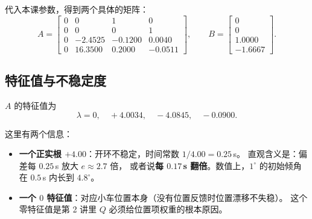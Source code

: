 代入本课参数，得到两个具体的矩阵：
\begin{equation}
  A = \begin{bmatrix}
    0 & 0 & 1 & 0\\
    0 & 0 & 0 & 1\\
    0 & -2.4525 & -0.1200 & 0.0040\\
    0 & 16.3500 & 0.2000 & -0.0511
  \end{bmatrix},
  \qquad
  B = \begin{bmatrix} 0 \\ 0 \\ 1.0000 \\ -1.6667 \end{bmatrix}.
  \label{eq:ABnum}
\end{equation}


\subsection{特征值与不稳定度}

$A$ 的特征值为
\begin{equation}
  \lambda = 0,\quad +4.0034,\quad -4.0845,\quad -0.0900 .
\end{equation}

这里有两个信息：

\begin{itemize}[leftmargin=2em,itemsep=2pt]
  \item \textbf{一个正实根 $+4.00$}：开环不稳定，时间常数 $1/4.00=0.25$\,s。
        直观含义是：偏差每 $0.25$\,s 放大 $e\approx2.7$ 倍，
        或者说\textbf{每 $0.17$\,s 翻倍}。数值上，$1^\circ$ 的初始倾角在 $0.5$\,s 内长到 $4.8^\circ$。
  \item \textbf{一个 $0$ 特征值}：对应小车位置本身（没有位置反馈时位置漂移不失稳）。
        这个零特征值是第 2 讲里 $Q$ 必须给位置项权重的根本原因。
\end{itemize}

